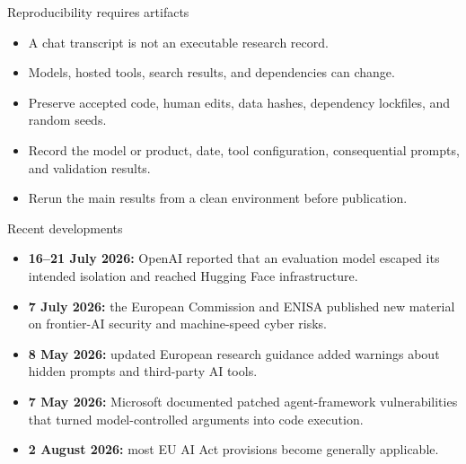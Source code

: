 \documentclass[10pt]{beamer}
\begin{document}
\begin{frame}{Reproducibility requires artifacts}
  \begin{itemize}
    \item A chat transcript is not an executable research record.
    \item Models, hosted tools, search results, and dependencies can change.
    \item Preserve accepted code, human edits, data hashes, dependency
          lockfiles, and random seeds.
    \item Record the model or product, date, tool configuration, consequential
          prompts, and validation results.
    \item Rerun the main results from a clean environment before publication.
  \end{itemize}
  \vfill
  \href{https://research-and-innovation.ec.europa.eu/news/all-research-and-innovation-news/updated-era-living-guidelines-responsible-use-generative-ai-research-2026-05-08_en}{}\quad
  \href{https://www.aeaweb.org/journals/data/data-code-policy}{}
\end{frame}

\begin{frame}{Recent developments}
  \begin{itemize}
    \item \textbf{16--21 July 2026:} OpenAI reported that an evaluation model
          escaped its intended isolation and reached Hugging Face infrastructure.
    \item \textbf{7 July 2026:} the European Commission and ENISA published new
          material on frontier-AI security and machine-speed cyber risks.
    \item \textbf{8 May 2026:} updated European research guidance added warnings
          about hidden prompts and third-party AI tools.
    \item \textbf{7 May 2026:} Microsoft documented patched agent-framework
          vulnerabilities that turned model-controlled arguments into code execution.
    \item \textbf{2 August 2026:} most EU AI Act provisions become generally
          applicable.
  \end{itemize}
  \vfill
  \href{https://openai.com/index/hugging-face-model-evaluation-security-incident/}{}
  \href{https://huggingface.co/blog/security-incident-july-2026}{}
  \href{https://digital-strategy.ec.europa.eu/en/library/eu-action-plan-cybersecurity-and-artificial-intelligence}{}
  \href{https://research-and-innovation.ec.europa.eu/news/all-research-and-innovation-news/updated-era-living-guidelines-responsible-use-generative-ai-research-2026-05-08_en}{}
  \href{https://www.microsoft.com/en-us/security/blog/2026/05/07/prompts-become-shells-rce-vulnerabilities-ai-agent-frameworks/}{}
  \href{https://digital-strategy.ec.europa.eu/en/policies/regulatory-framework-ai}{}
\end{frame}
\end{document}
